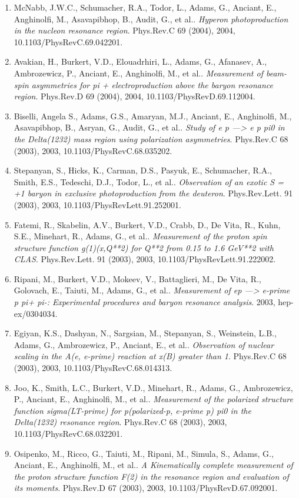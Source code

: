 \begin{enumerate}
\item McNabb, J.W.C., Schumacher, R.A., Todor, L., Adams, G., Anciant, E., Anghinolfi, M., Asavapibhop, B., Audit, G., et al.. \textit{Hyperon photoproduction in the nucleon resonance region}. Phys.Rev.C 69 (2004), 2004, 10.1103/PhysRevC.69.042201.
\item Avakian, H., Burkert, V.D., Elouadrhiri, L., Adams, G., Afanasev, A., Ambrozewicz, P., Anciant, E., Anghinolfi, M., et al.. \textit{Measurement of beam-spin asymmetries for pi + electroproduction above the baryon resonance region}. Phys.Rev.D 69 (2004), 2004, 10.1103/PhysRevD.69.112004.
\item Biselli, Angela S., Adams, G.S., Amaryan, M.J., Anciant, E., Anghinolfi, M., Asavapibhop, B., Asryan, G., Audit, G., et al.. \textit{Study of e p ---> e p pi0 in the Delta(1232) mass region using polarization asymmetries}. Phys.Rev.C 68 (2003), 2003, 10.1103/PhysRevC.68.035202.
\item Stepanyan, S., Hicks, K., Carman, D.S., Pasyuk, E., Schumacher, R.A., Smith, E.S., Tedeschi, D.J., Todor, L., et al.. \textit{Observation of an exotic S = +1 baryon in exclusive photoproduction from the deuteron}. Phys.Rev.Lett. 91 (2003), 2003, 10.1103/PhysRevLett.91.252001.
\item Fatemi, R., Skabelin, A.V., Burkert, V.D., Crabb, D., De Vita, R., Kuhn, S.E., Minehart, R., Adams, G., et al.. \textit{Measurement of the proton spin structure function g(1)(x,Q**2) for Q**2 from 0.15 to 1.6 GeV**2 with CLAS}. Phys.Rev.Lett. 91 (2003), 2003, 10.1103/PhysRevLett.91.222002.
\item Ripani, M., Burkert, V.D., Mokeev, V., Battaglieri, M., De Vita, R., Golovach, E., Taiuti, M., Adams, G., et al.. \textit{Measurement of ep ---> e-prime p pi+ pi-: Experimental procedures and baryon resonance analysis}. 2003, hep-ex/0304034.
\item Egiyan, K.S., Dashyan, N., Sargsian, M., Stepanyan, S., Weinstein, L.B., Adams, G., Ambrozewicz, P., Anciant, E., et al.. \textit{Observation of nuclear scaling in the A(e, e-prime) reaction at x(B) greater than 1}. Phys.Rev.C 68 (2003), 2003, 10.1103/PhysRevC.68.014313.
\item Joo, K., Smith, L.C., Burkert, V.D., Minehart, R., Adams, G., Ambrozewicz, P., Anciant, E., Anghinolfi, M., et al.. \textit{Measurement of the polarized structure function sigma(LT-prime) for p(polarized-p, e-prime p) pi0 in the Delta(1232) resonance region}. Phys.Rev.C 68 (2003), 2003, 10.1103/PhysRevC.68.032201.
\item Osipenko, M., Ricco, G., Taiuti, M., Ripani, M., Simula, S., Adams, G., Anciant, E., Anghinolfi, M., et al.. \textit{A Kinematically complete measurement of the proton structure function F(2) in the resonance region and evaluation of its moments}. Phys.Rev.D 67 (2003), 2003, 10.1103/PhysRevD.67.092001.

\end{enumerate}
